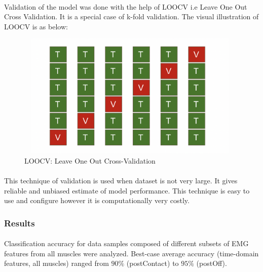 \documentclass[12pt]{article}
\begin{document}
\paragraph{}
Validation of the model was done with the help of LOOCV i.e Leave One Out Cross Validation. It is a special case of k-fold validation. The visual illustration of LOOCV is as below:

\begin{figure}[H]
	\begin{center}
		\includegraphics[height=6cm,width=11cm]{LOOCV}
	\end{center}
	\caption{LOOCV: Leave One Out Cross-Validation}
\end{figure}

\paragraph{}
This technique of validation is used when dataset is not very large. It gives reliable and unbiased estimate of model performance. This technique is easy to use and configure however it is computationally very costly.


\subsubsection{Results}
\paragraph{}
Classification accuracy for data samples composed of different subsets of EMG features from all muscles were analyzed. Best-case average accuracy (time-domain features, all muscles) ranged from $90\%$ (postContact) to $95\%$ (postOff).
\end{document}
